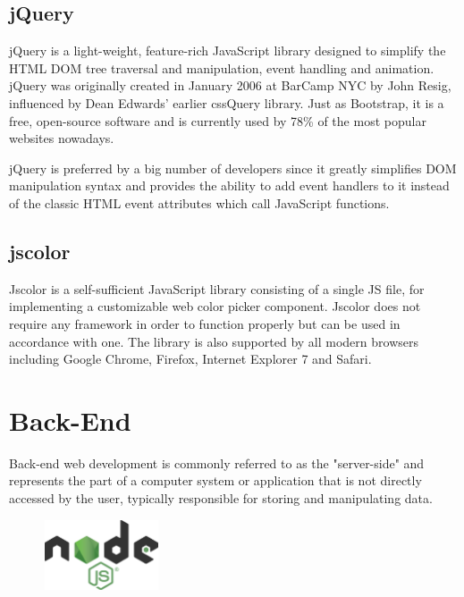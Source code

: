 \documentclass{report}
\begin{document}
\subsection {jQuery}
jQuery is a light-weight, feature-rich JavaScript library designed to simplify the HTML DOM tree traversal and manipulation, event handling and animation. jQuery was originally created in January 2006 at BarCamp NYC by John Resig, influenced by Dean Edwards' earlier cssQuery library. Just as Bootstrap, it is a free,  open-source software and is currently used by 78\% of the most popular websites nowadays. \par
jQuery is preferred by a big number of developers since it greatly simplifies DOM manipulation syntax and provides the ability to add event handlers to it instead of the classic HTML event attributes which call JavaScript functions.

\subsection {jscolor}
Jscolor is a self-sufficient JavaScript library consisting of a single JS file, for implementing a customizable web color picker component. Jscolor does not require any framework in order to function properly but can be used in accordance with one. The library is also supported by all modern browsers including Google Chrome, Firefox, Internet Explorer 7 and Safari.


\section {Back-End}
Back-end web development is commonly referred to as the "server-side" and represents the part of a computer system or application that is not directly accessed by the user, typically responsible for storing and manipulating data.

\begin{figure}
	\vspace*{-1cm}
    \centering
    \includegraphics[width=0.3\textwidth]{nodejs}
	\vspace{-10pt} 
\end{figure}
\end{document}
